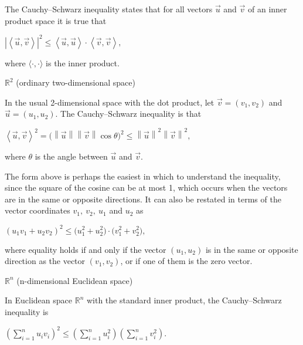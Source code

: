 \documentclass[UTF8]{ctexart}
\numberwithin{equation}{section}
\numberwithin{figure}{section}
\numberwithin{table}{section}
\newcommand\ls{\leqslant}
\begin{document}
\begin{spacing}{2}
The Cauchy–Schwarz inequality states that for all vectors $\stackrel{\rightarrow}{u}$ and $\stackrel{\rightarrow}{v}$ of an inner product space it is true that

\centerline{\textcolor[rgb]{0,0,1}{$\displaystyle \left|\left< \stackrel{\rightarrow}{u} ,\stackrel{\rightarrow}{v} \right> \right|^{2}\ls \left< \stackrel{\rightarrow}{u} ,\stackrel{\rightarrow}{u} \right> \cdot \left< \stackrel{\rightarrow}{v} ,\stackrel{\rightarrow}{v} \right> ,$}}

where $\displaystyle \langle \cdot ,\cdot \rangle $ is the inner product. 

\textcolor[rgb]{1,0,0}{$\mathbb{R}^2$ (ordinary two-dimensional space)}

In the usual 2-dimensional space with the dot product, let $\displaystyle \stackrel{\rightarrow}{v}=(v_{1},v_{2})$ and ${\displaystyle \stackrel{\rightarrow}{u}=(u_{1},u_{2})}$. The Cauchy–Schwarz inequality is that

\centerline{\textcolor[rgb]{0,0,1}{${\displaystyle \left< \stackrel{\rightarrow}{u},\stackrel{\rightarrow}{v}\right>^{2}=\Big(\left\|\stackrel{\rightarrow}{u}\right\|\left\|\stackrel{\rightarrow}{v}\right\|\cos \theta \Big)^{2}\ls \left\|\stackrel{\rightarrow}{u}\right\|^{2}\left\|\stackrel{\rightarrow}{v}\right\|^{2}} ,$}}

where $\theta$  is the angle between $\stackrel{\rightarrow}{u}$ and $\stackrel{\rightarrow}{v}$.

The form above is perhaps the easiest in which to understand the inequality, since the square of the cosine can be at most 1, which occurs when the vectors are in the same or opposite directions. It can also be restated in terms of the vector coordinates ${\displaystyle v_{1},\ v_{2},\ u_{1}}$ and $u_{2}$ as

\centerline{\textcolor[rgb]{0,0,1}{${\displaystyle (u_{1}v_{1}+u_{2}v_{2})^{2}\ls \big(u_{1}^{2}+u_{2}^{2}\big)\cdot \big(v_{1}^{2}+v_{2}^{2}\big)},\ $}}

where equality holds if and only if the vector $(u_{1},u_{2})$ is in the same or opposite direction as the vector ${\displaystyle (v_{1},v_{2})}$, or if one of them is the zero vector.

\textcolor[rgb]{1,0,0}{$\mathbb{R}^n$ (n-dimensional Euclidean space)}

In Euclidean space ${\displaystyle \mathbb {R} ^{n}}$ with the standard inner product, the Cauchy–Schwarz inequality is

\centerline{\textcolor[rgb]{0,0,1}{${\displaystyle \left(\sum _{i=1}^{n}u_{i}v_{i}\right)^{2}\ls \left(\sum _{i=1}^{n}u_{i}^{2}\right)\left(\sum _{i=1}^{n}v_{i}^{2}\right)} .$}}


\end{spacing}
\end{document}
